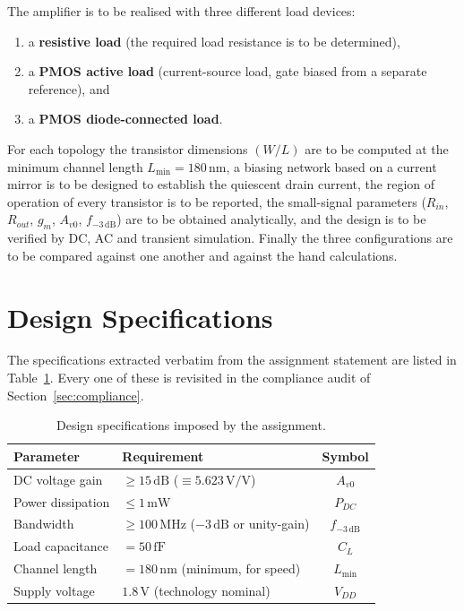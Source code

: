 \documentclass[12pt,a4paper]{article}
\newcommand{\U}[1]{\,\mathrm{#1}}
\begin{document}
The amplifier is to be realised with three different load devices:

\begin{enumerate}[label=(\alph*),leftmargin=2.2em,itemsep=2pt]
  \item a \textbf{resistive load} (the required load resistance is to be determined),
  \item a \textbf{PMOS active load} (current-source load, gate biased from a
        separate reference), and
  \item a \textbf{PMOS diode-connected load}.
\end{enumerate}

For each topology the transistor dimensions $(W/L)$ are to be computed at the
minimum channel length $L_{\min} = 180\U{nm}$, a biasing network based on a
current mirror is to be designed to establish the quiescent drain current, the
region of operation of every transistor is to be reported, the small-signal
parameters ($R_{in}$, $R_{out}$, $g_m$, $A_{v0}$, $f_{-3\U{dB}}$) are to be
obtained analytically, and the design is to be verified by DC, AC and transient
simulation. Finally the three configurations are to be compared against one
another and against the hand calculations.

\section{Design Specifications}
The specifications extracted verbatim from the assignment statement are listed
in Table~\ref{tab:specs}. Every one of these is revisited in the compliance
audit of Section~\ref{sec:compliance}.

\begin{table}[H]
\centering
\caption{Design specifications imposed by the assignment.}
\label{tab:specs}
\begin{tabular}{llc}
\toprule
\textbf{Parameter} & \textbf{Requirement} & \textbf{Symbol} \\
\midrule
DC voltage gain          & $\geq 15\U{dB}$ ($\equiv 5.623\U{V/V}$) & $A_{v0}$ \\
Power dissipation        & $\leq 1\U{mW}$                          & $P_{DC}$ \\
Bandwidth                & $\geq 100\U{MHz}$ ($-3\U{dB}$ or unity-gain) & $f_{-3\U{dB}}$ \\
Load capacitance         & $= 50\U{fF}$                            & $C_L$ \\
Channel length           & $= 180\U{nm}$ (minimum, for speed)      & $L_{\min}$ \\
Supply voltage           & $1.8\U{V}$ (technology nominal)         & $V_{DD}$ \\
\bottomrule
\end{tabular}
\end{table}
\end{document}
